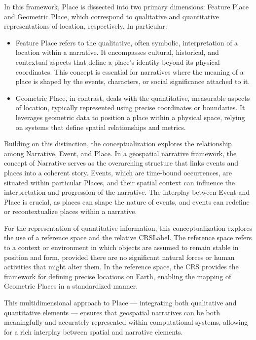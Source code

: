 In this framework, Place is dissected into two primary dimensions: Feature Place and Geometric Place, which correspond to qualitative and quantitative representations of location, respectively. In particular:

\begin{itemize}
    \item Feature Place refers to the qualitative, often symbolic, interpretation of a location within a narrative. It encompasses cultural, historical, and contextual aspects that define a place's identity beyond its physical coordinates. This concept is essential for narratives where the meaning of a place is shaped by the events, characters, or social significance attached to it.
    \item Geometric Place, in contrast, deals with the quantitative, measurable aspects of location, typically represented using precise coordinates or boundaries. It leverages geometric data to position a place within a physical space, relying on systems that define spatial relationships and metrics.
\end{itemize}

Building on this distinction, the conceptualization explores the relationship among Narrative, Event, and Place. In a geospatial narrative framework, the concept of Narrative serves as the overarching structure that links events and places into a coherent story. Events, which are time-bound occurrences, are situated within particular Places, and their spatial context can influence the interpretation and progression of the narrative. The interplay between Event and Place is crucial, as places can shape the nature of events, and events can redefine or recontextualize places within a narrative.

For the representation of quantitative information, this conceptualization explores the use of a reference space and the relative \acrfull{CRSLabel}. The reference space refers to a context or environment in which objects are assumed to remain stable in position and form, provided there are no significant natural forces or human activities that might alter them. In the reference space, the CRS provides the framework for defining precise locations on Earth, enabling the mapping of Geometric Places in a standardized manner.

This multidimensional approach to Place — integrating both qualitative and quantitative elements — ensures that geospatial narratives can be both meaningfully and accurately represented within computational systems, allowing for a rich interplay between spatial and narrative elements.


